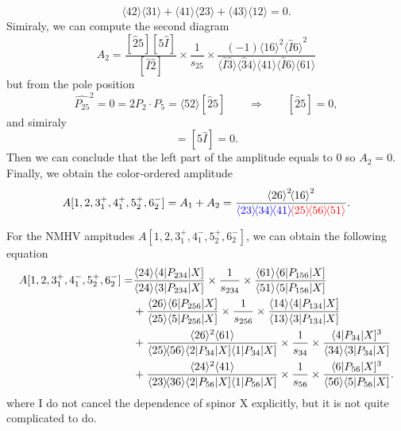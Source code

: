 \documentclass[12pt]{article}
\numberwithin{equation}{section}
\newcommand{\mdavg}[2]{\langle #1 \rangle\!\langle #2 \rangle}
\newcommand{\avg}[1]{\langle #1 \rangle}
\newcommand{\asqu}[1]{{\langle#1\rangle}^2}
\newcommand{\cbrak}[2]{\avg{#1}\![#2]}
\newcommand{\asbra}[3]{\langle #1 | #2 |#3 ]}
\begin{document}
\begin{equation}
    \mdavg{42}{31}+\mdavg{41}{23}+\mdavg{43}{12}=0.
\end{equation}
Simiraly, we can compute the second diagram
\begin{equation}
    A_2=\frac{[\hat{2}5][5\hat{I}]}{[\hat{I}\hat{2}]}\times\frac{1}{s_{25}}\times \frac{(-1)\asqu{16}\asqu{\hat{I}6}}{\mdavg{\hat{I}\hat{3}}{\hat{3}4}
    \!\mdavg{41}{\hat{I}6}\!\avg{61}}
\end{equation}
but from the pole position
\begin{equation}
    \hat{P_{25}}^2=0=2P_2\cdot P_5=\cbrak{52}{\hat{2}5}\qquad\Rightarrow \qquad [\hat{2}5]=0,
\end{equation}
and simiraly
\begin{equation}
    [\hat{2}\hat{I}]=[5\hat{I}]=0.
\end{equation}
Then we can conclude that the left part of the amplitude equals to 0 so $A_2=0$. Finally, we obtain the color-ordered amplitude 
\begin{equation}
    A[1,2,3_1^+,4_1^+,5_2^+,6_2^-]=A_1+A_2=\frac{\asqu{26}\!\asqu{16}}{\textcolor{blue}{\mdavg{23}{34}\!\avg{41}}\!\textcolor{red}{\mdavg{25}{56}\!\avg{51}}}.
\end{equation}

For the NMHV ampitudes $A[1,2,3_1^+,4_1^-,5_2^+,6_2^-]$, we can obtain the following equation
\begin{align}
    A[1,2,3_1^+,4_1^-,5_2^+,6_2^-] =& \frac{\avg{24}\asbra{4}{P_{234}}{X}}{\avg{24}\asbra{3}{P_{234}}{X}}\times\frac{1}{s_{234}}\times\frac{\avg{61}\asbra{6}{P_{156}}{X}}{\avg{51}\asbra{5}{P_{156}}{X}}\notag\\
    &+\frac{\avg{26}\asbra{6}{P_{256}}{X}}{\avg{25}\asbra{5}{P_{256}}{X}}\times\frac{1}{s_{256}}\times\frac{\avg{14}\asbra{4}{P_{134}}{X}}{\avg{13}\asbra{3}{P_{134}}{X}}\notag\\
    &+\frac{\avg{26}^2\avg{61}}{\mdavg{25}{56}\asbra{2}{P_{34}}{X}\asbra{1}{P_{34}}{X}}\times\frac{1}{s_{34}}\times\frac{\asbra{4}{P_{34}}{X}^3}{\avg{34}\asbra{3}{P_{34}}{X}}\notag\\
    &+\frac{\avg{24}^2\avg{41}}{\mdavg{23}{36}\asbra{2}{P_{56}}{X}\asbra{1}{P_{56}}{X}}\times\frac{1}{s_{56}}\times\frac{\asbra{6}{P_{56}}{X}^3}{\avg{56}\asbra{5}{P_{56}}{X}}.
\end{align}
where I do not cancel the dependence of spinor X explicitly, but it is not quite complicated to do.
\end{document}

